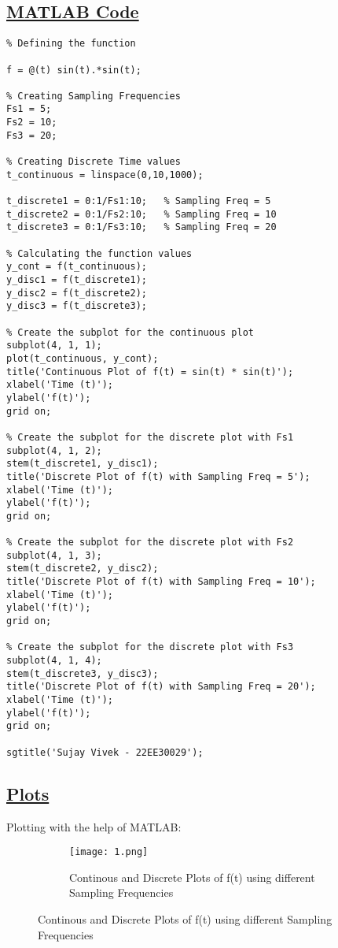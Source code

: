 \documentclass[a4paper,12pt,fleqn]{article}
\begin{document}
\subsection*{\underline{MATLAB Code}}
\begin{lstlisting}
% Defining the function

f = @(t) sin(t).*sin(t);

% Creating Sampling Frequencies
Fs1 = 5;
Fs2 = 10;
Fs3 = 20;

% Creating Discrete Time values
t_continuous = linspace(0,10,1000); 

t_discrete1 = 0:1/Fs1:10;   % Sampling Freq = 5
t_discrete2 = 0:1/Fs2:10;   % Sampling Freq = 10
t_discrete3 = 0:1/Fs3:10;   % Sampling Freq = 20

% Calculating the function values
y_cont = f(t_continuous);
y_disc1 = f(t_discrete1);
y_disc2 = f(t_discrete2);
y_disc3 = f(t_discrete3);

% Create the subplot for the continuous plot
subplot(4, 1, 1);
plot(t_continuous, y_cont);
title('Continuous Plot of f(t) = sin(t) * sin(t)');
xlabel('Time (t)');
ylabel('f(t)');
grid on;

% Create the subplot for the discrete plot with Fs1
subplot(4, 1, 2); 
stem(t_discrete1, y_disc1);
title('Discrete Plot of f(t) with Sampling Freq = 5');
xlabel('Time (t)');
ylabel('f(t)');
grid on;

% Create the subplot for the discrete plot with Fs2
subplot(4, 1, 3);
stem(t_discrete2, y_disc2);
title('Discrete Plot of f(t) with Sampling Freq = 10');
xlabel('Time (t)');
ylabel('f(t)');
grid on;

% Create the subplot for the discrete plot with Fs3
subplot(4, 1, 4);
stem(t_discrete3, y_disc3);
title('Discrete Plot of f(t) with Sampling Freq = 20');
xlabel('Time (t)');
ylabel('f(t)');
grid on;

sgtitle('Sujay Vivek - 22EE30029');

\end{lstlisting}

\FloatBarrier  %
\newpage

\subsection*{\underline{Plots}}
Plotting with the help of MATLAB:
\begin{figure}[h]
    \centering
    \begin{subfigure}{1.15\textwidth} %
        \centering
        \texttt{[image: 1.png]}
        \caption{Continous and Discrete Plots of f(t) using different Sampling Frequencies}
    \end{subfigure}
    \hfill %
   
\end{figure}
\end{document}
